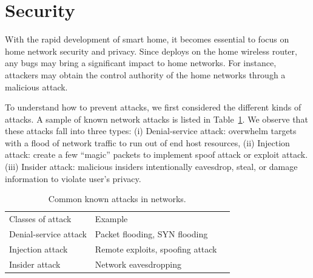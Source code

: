 \section{Security}
\label{sec.security}
With the rapid development of smart home, it becomes essential to focus on home network security and privacy. Since \sysname deploys on the home wireless router, any bugs may bring a significant impact to home networks. For instance, attackers may obtain the control authority of the home networks through a malicious attack. 

To understand how to prevent attacks, we first considered the different kinds of attacks. A sample of known network attacks is listed in Table~\ref{table: attack}. We observe that these attacks fall into three types: (i) Denial-service attack: overwhelm targets with a flood of network traffic to run out of end host resources, (ii) Injection attack: create a few ``magic'' packets to implement spoof attack or exploit attack. (iii) Insider attack: malicious insiders intentionally eavesdrop, steal, or damage information to violate user's privacy.

\begin{table}[]
\centering
\begin{tabular}{|l|l|l}
\cline{1-2}
Classes of attack     & Example                                 &  \\ \cline{1-2}
Denial-service attack & Packet flooding, SYN flooding\cite{eddy2011syn}             &  \\ \cline{1-2}
Injection attack      & Remote exploits\cite{shellcode},  spoofing attack\cite{bishop1996attack} &  \\ \cline{1-2}
Insider attack        & Network eavesdropping                   &  \\ \cline{1-2}
\end{tabular}
\caption{Common known attacks in networks.}
\label{table: attack}
\end{table}

